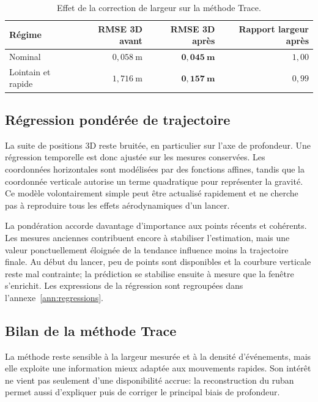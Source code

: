 \documentclass[a4paper,11pt]{report}
\begin{document}
\begin{table}[H]
  \centering
  \caption{Effet de la correction de largeur sur la méthode Trace.}
  \label{tab:ablation-correction-trace}
  \begin{tabular}{L{0.25\textwidth}rrr}
    \toprule
    Régime & RMSE 3D avant & RMSE 3D après & Rapport largeur après \\
    \midrule
    Nominal & \(0{,}058~\text{m}\) & \(\mathbf{0{,}045~\text{m}}\) & \(1{,}00\) \\
    Lointain et rapide & \(1{,}716~\text{m}\) & \(\mathbf{0{,}157~\text{m}}\) & \(0{,}99\) \\
    \bottomrule
  \end{tabular}
\end{table}


\subsection{Régression pondérée de trajectoire}

La suite de positions 3D reste bruitée, en particulier sur l'axe de profondeur.
Une régression temporelle est donc ajustée sur les mesures conservées. Les
coordonnées horizontales sont modélisées par des fonctions affines, tandis que
la coordonnée verticale autorise un terme quadratique pour représenter la
gravité. Ce modèle volontairement simple peut être actualisé rapidement et ne
cherche pas à reproduire tous les effets aérodynamiques d'un lancer.

La pondération accorde davantage d'importance aux points récents et cohérents.
Les mesures anciennes contribuent encore à stabiliser l'estimation, mais une
valeur ponctuellement éloignée de la tendance influence moins la trajectoire
finale. Au début du lancer, peu de points sont disponibles et la courbure
verticale reste mal contrainte; la prédiction se stabilise ensuite à mesure que
la fenêtre s'enrichit. Les expressions de la régression sont regroupées dans
l'annexe~\ref{ann:regressions}.

\subsection{Bilan de la méthode Trace}

La méthode reste sensible à la largeur mesurée et à la densité d'événements,
mais elle exploite une information mieux adaptée aux mouvements rapides. Son
intérêt ne vient pas seulement d'une disponibilité accrue: la reconstruction
du ruban permet aussi d'expliquer puis de corriger le principal biais de
profondeur.
\end{document}
